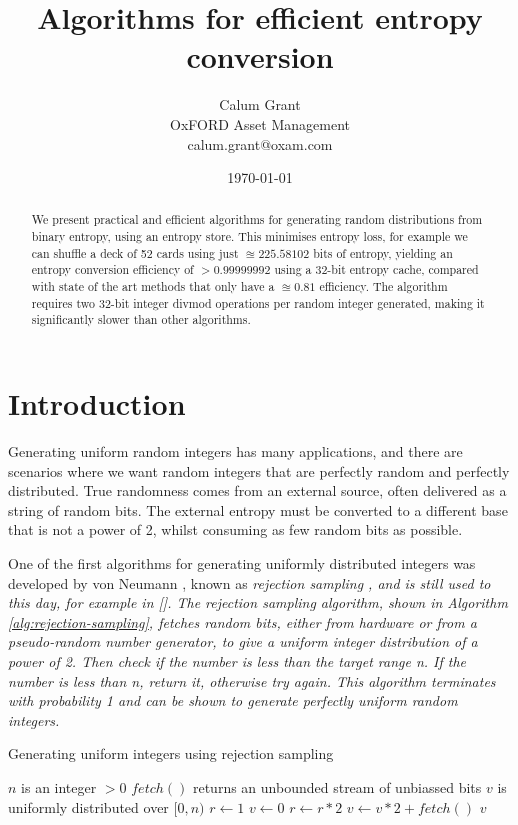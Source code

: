 \documentclass[12pt]{article}
\title{Algorithms for efficient entropy conversion}
\author{Calum Grant \\
OxFORD Asset Management \\
calum.grant@oxam.com}
\date{\today}
\begin{document}
\maketitle

\begin{abstract}
    We present practical and efficient algorithms for generating random distributions from binary entropy, using an entropy store. This minimises entropy loss, for example we can shuffle a deck of 52 cards using just $\approxeq 225.58102$ bits of entropy, yielding an entropy conversion efficiency of $>0.99999992$ using a 32-bit entropy cache, compared with state of the art methods that only have a $\approxeq 0.81$ efficiency.  The algorithm requires two 32-bit integer divmod operations per random integer generated, making it significantly slower than other algorithms.
\end{abstract}

\section{Introduction}

Generating uniform random integers has many applications, and there are scenarios where we want random integers that are perfectly random and perfectly distributed. True randomness comes from an external source, often delivered as a string of random bits. The external entropy must be converted to a different base that is not a power of 2, whilst consuming as few random bits as possible.

One of the first algorithms for generating uniformly distributed integers was developed by von Neumann \cite{neumann}, known as \em rejection sampling \em, and is still used to this day, for example in []. The rejection sampling algorithm, shown in Algorithm \ref{alg:rejection-sampling}, fetches random bits, either from hardware or from a pseudo-random number generator, to give a uniform integer distribution of a power of 2. Then check if the number is less than the target range n. If the number is less than n, return it, otherwise try again. This algorithm terminates with probability 1 and can be shown to generate perfectly uniform random integers.

\begin{algorithm}
\caption{Generating uniform integers using rejection sampling}
    \label{alg:rejection-sampling}
\begin{algorithmic}[1]
    \Require $n$ is an integer $>0$
    \Require $fetch()$ returns an unbounded stream of unbiassed bits
    \Ensure $v$ is uniformly distributed over $[0,n)$
        \State $r \gets 1$
        \State $v \gets 0$
            \State $r \gets r * 2$
            \State $v \gets v * 2 + fetch()$
        \EndWhile
            \State \Return $v$
        \EndIf
    \EndWhile
\EndProcedure
\end{algorithmic}
\end{algorithm}
\end{document}
